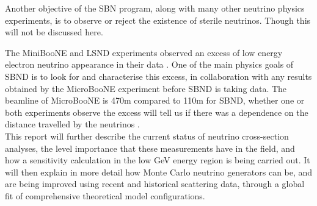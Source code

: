 Another objective of the SBN program, along with many other neutrino physics experiments, is to observe or reject the existence of sterile neutrinos. Though this will not be discussed here.

The MiniBooNE and LSND experiments observed an excess of low energy electron neutrino appearance in their data \cite{mbEx}. One of the main physics goals of SBND is to look for and characterise this excess, in collaboration with any results obtained by the MicroBooNE experiment before SBND is taking data. The beamline of MicroBooNE is 470m compared to 110m for SBND, whether one or both experiments observe the excess will tell us if there was a dependence on the distance travelled by the neutrinos \cite{sbn}. \\

This report will further describe the current status of neutrino cross-section analyses, the level importance that these measurements have in the field, and how a sensitivity calculation in the low GeV energy region is being carried out. It will then explain in more detail how Monte Carlo neutrino generators can be, and are being improved using recent and historical scattering data, through a global fit of comprehensive theoretical model configurations.  

\clearpage
